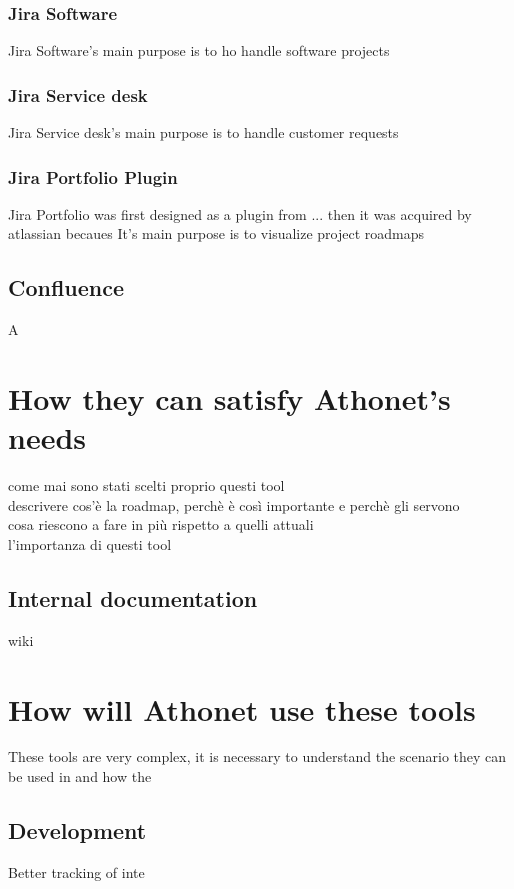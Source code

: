 		\subsubsection{Jira Software}
			Jira Software's main purpose is to ho handle software projects
		
		\subsubsection{Jira Service desk}
			Jira Service desk's main purpose is to handle customer requests

		\subsubsection{Jira Portfolio Plugin}
			Jira Portfolio was first designed as a plugin from ... then it was acquired by atlassian becaues
			It's main purpose is to visualize project roadmaps
		
	\subsection{Confluence}
		A

\section{How they can satisfy Athonet's needs}
come mai sono stati scelti proprio questi tool\\
descrivere cos'è la roadmap, perchè è così importante e perchè gli servono\\
cosa riescono a fare in più rispetto a quelli attuali\\
l'importanza di questi tool
		
	\subsection{Internal documentation}
		wiki

\section{How will Athonet use these tools}

	These tools are very complex, it is necessary to understand the scenario they can be used in and how the

	\subsection{Development} 
		Better tracking of inte
	

